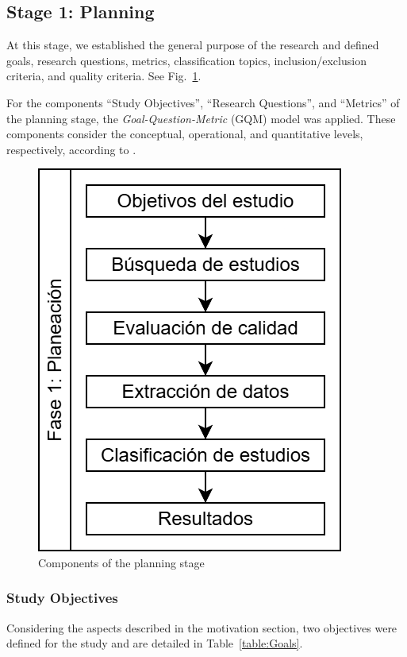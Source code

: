 \subsection{Stage 1: Planning}\label{sec:planeacion}

At this stage, we established the general purpose of the research and defined goals, research questions, metrics, classification topics, inclusion/exclusion criteria, and quality criteria. See Fig.~\ref{fig:PlanningStageOverview}.

For the components ``Study Objectives'', ``Research Questions'', and ``Metrics'' of the planning stage, the {\itshape Goal-Question-Metric} (GQM) model \cite{basili1992software, caldiera1994goal} was applied. These components consider the conceptual, operational, and quantitative levels, respectively, according to \cite{Sepúlveda202141}.


\begin{figure}[htbp]
	\centering
	\includegraphics[scale=0.4]{resources/figures/sms-Etapa-1 overview.drawio.png}
	\caption{Components of the planning stage}
	\label{fig:PlanningStageOverview}
\end{figure}

\subsubsection{Study Objectives}
Considering the aspects described in the motivation section, two objectives were defined for the study and are detailed in Table~\ref{table:Goals}.

